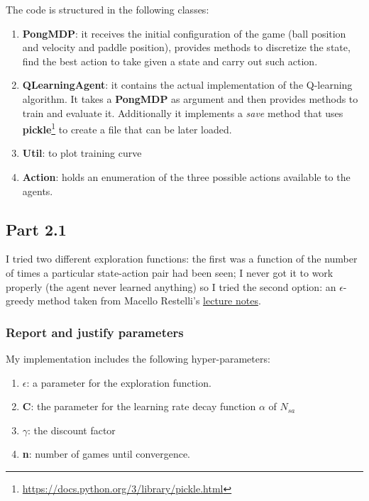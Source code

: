 \documentclass[11pt]{article}
\begin{document}
The code is structured in the following classes:
\begin{enumerate}
\item \textbf{PongMDP}: it receives the initial configuration of the game (ball position and velocity and paddle position), provides methods to discretize the state, find the best action to take given a state and carry out such action.
\item \textbf{QLearningAgent}: it contains the actual implementation of the Q-learning algorithm. It takes a \textbf{PongMDP} as argument and then provides methods to train and evaluate it. Additionally it implements a \textit{save} method that uses \textbf{pickle}\footnote{\url{https://docs.python.org/3/library/pickle.html}} to create a file that can be later loaded.
\item \textbf{Util}: to plot training curve
\item \textbf{Action}: holds an enumeration of the three possible actions available to the agents.
\end{enumerate}

\subsection*{Part 2.1}
I tried two different exploration functions: the first was a function of the number of times a particular state-action pair had been seen; I never got it to work properly (the agent never learned anything) so I tried the second option: an $\epsilon$-greedy method taken from Macello Restelli's \href{http://home.deib.polimi.it/restelli/MyWebSite/pdf/rl5.pdf}{lecture notes}.\\

\subsubsection*{Report and justify parameters}

My implementation includes the following hyper-parameters:
\begin{enumerate}
\item $\epsilon$: a parameter for the exploration function.
\item \textbf{C}: the parameter for the learning rate decay function $\alpha$ of $N_{sa}$
\item $\gamma$: the discount factor
\item \textbf{n}: number of games until convergence.
\end{enumerate}
\end{document}
